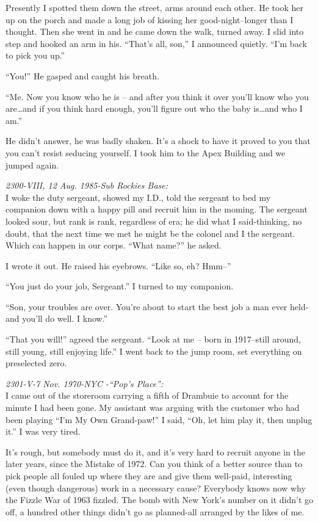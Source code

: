 Presently I spotted them down the street,  arms  around
each  other. He took her up on the porch and made a long job of
kissing her good-night--longer than I thought. Then she went  in
and  he  came  down the walk, turned away. I slid into step and
hooked an arm in  his. ``That's all, son,''  I  announced
quietly. ``I'm back to pick you up.''

``You!'' He gasped and caught his breath.

``Me.  Now  you  know who he is -- and after you think it
over you'll know who you are\dots and if you think  hard  enough,
you'll figure out who the baby is\dots and who I am.''

He  didn't answer, he was badly shaken. It's a shock to
have it proved to you that you can't resist seducing  yourself.
I took him to the Apex Building and we jumped again.

\emph{2300-VIII,  12  Aug.  1985-Sub Rockies Base:}\\
I woke the duty sergeant, showed my I.D., told the  sergeant  to  bed  my
companion down with a happy pill and recruit him in the moming.
The  sergeant looked sour, but rank is rank, regardless of era;
he did what I said-thinking, no doubt, that the  next  time  we
met  he  might  be  the  colonel  and I the sergeant. Which can
happen in our corps. ``What name?'' he asked.

I wrote it out. He raised his eyebrows. ``Like so, eh? Hmm--''

``You just do your job, Sergeant.'' I  turned  to  my companion.

``Son, your troubles are over. You're about to start the
best job a man ever held-and you'll do well. I know.''

``That  you will!'' agreed the sergeant. ``Look at me --
born in 1917--still around, still young, still enjoying life.''
I went back to the jump room,  set  everything  on  preselected
zero.

\emph{2301-V-7  Nov.  1970-NYC  -``Pop's Place'':}\\
I came out of the storeroom carrying a fifth of Drambuie to account
for  the minute  I  had  been  gone.  My  assistant was arguing with the
customer who had been playing ``I'm My Own Grand-paw!'' I  said,
``Oh, let him play it, then unplug it.'' I was very tired.

It's rough, but somebody must do it, and it's very hard
to recruit  anyone  in  the  later  years, since the Mistake of
1972. Can you think of a better source than to pick people  all
fouled  up  where they are and give them well-paid, interesting
(even though dangerous) work in a  necessary  cause?  Everybody
knows now why the Fizzle War of 1963 fizzled. The bomb with New
York's  number  on  it  didn't  go  off, a hundred other things
didn't go as planned-all arranged by the likes of me.


